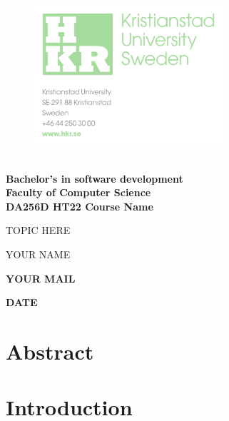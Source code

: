 \documentclass{article}
\begin{document}
	
	\begin{figure}[h!]

			\includegraphics[width=7cm]{images/hkr.png}
			\label{title}
	   \endminipage
		\endminipage
	\end{figure}
	
	\vspace{0.8cm}
	\Large

	\textbf{\\
	Bachelor’s in software development\\
	Faculty of Computer Science\\
	DA256D HT22 Course Name}  %
	\begin{center}
	\vspace{3cm}
	\Huge
	
	TOPIC HERE
	
	\vspace{2cm}
	\LARGE
	YOUR NAME
	
	\vspace{0.4cm}	
	\large
	\textbf{YOUR MAIL}		\vspace{0.9cm}	

    \textbf{DATE}
	\end{center}
	
\thispagestyle{empty}       %

\newpage
	





\tableofcontents
\large

\thispagestyle{empty}        %


\newpage 

\section*{Abstract}
\thispagestyle{empty}        %

\newpage
\section{Introduction}
\vspace{1cm}
\end{document}
